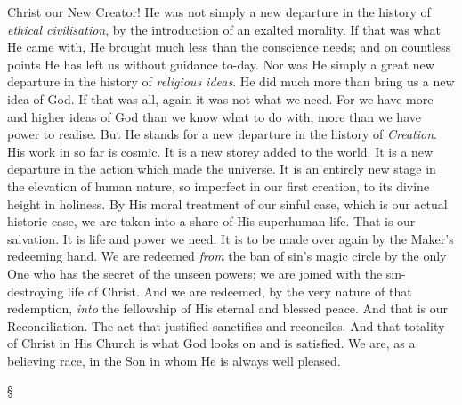 \documentclass[12pt,letterpaper,oneside]{book}
\begin{document}
Christ our New Creator! He was not simply 
a new departure in the history of \textit{ethical civilisation}, 
by the introduction of an exalted morality. 
If that was what He came with, He brought much 
less than the conscience needs; and on countless 
points He has left us without guidance to-day. 
Nor was He simply a great new departure in the 
history of \textit{religious ideas}. He did much more 
than bring us a new idea of God. If that was 
all, again it was not what we need. For we 
have more and higher ideas of God than we 
know what to do with, more than we have 
power to realise. But He stands for a new 
departure in the history of \textit{Creation}. His work 
in so far is cosmic. It is a new storey added to 
the world. It is a new departure in the action 
which made the universe. It is an entirely new 
stage in the elevation of human nature, so 
imperfect in our first creation, to its divine 
height in holiness. By His moral treatment of 
our sinful case, which is our actual historic case, 
we are taken into a share of His superhuman 
life. That is our salvation. It is life and power 
we need. It is to be made over again by the 
Maker's redeeming hand. We are redeemed 
\textit{from} the ban of sin's magic circle by the only 
One who has the secret of the unseen powers; 
we are joined with the sin-destroying life of 
Christ. And we are redeemed, by the very 
nature of that redemption, \textit{into} the fellowship of 
His eternal and blessed peace. And that is our 
Reconciliation. The act that justified sanctifies 
and reconciles. And that totality of Christ in 
His Church is what God looks on and is satisfied. 
We are, as a believing race, in the Son in whom 
He is always well pleased. 

\begin{center}
\S
\end{center}
\end{document}
